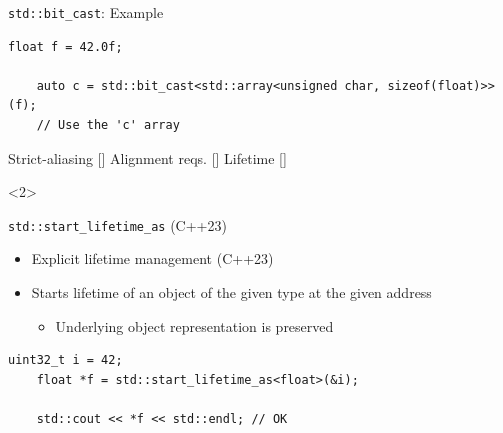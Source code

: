 \begin{frame}[fragile]{\texttt{std::bit\_cast}: Example}
  \begin{lstlisting}[style=c++]
    float f = 42.0f;

    auto c = std::bit_cast<std::array<unsigned char, sizeof(float)>>(f);
    // Use the 'c' array
  \end{lstlisting}

  \vspace{1em}
  \begin{center}
    Strict-aliasing [\OK]\hspace{4em}
    Alignment reqs. [\OK]\hspace{4em}
    Lifetime [\OK]\hspace{4em}
  \end{center}

  \begin{onlyenv}<2>
  \end{onlyenv}
\end{frame}

\begin{frame}[fragile]{\texttt{std::start\_lifetime\_as} (C++23)}
  \begin{itemize}
  \item Explicit lifetime management (C++23)

  \item Starts lifetime of an object of the given type at the given address
    \begin{itemize}
    \item Underlying object representation is preserved
    \end{itemize}
  \end{itemize}

  \begin{lstlisting}[style=c++]
    uint32_t i = 42;
    float *f = std::start_lifetime_as<float>(&i);

    std::cout << *f << std::endl; // OK
  \end{lstlisting}
\end{frame}

